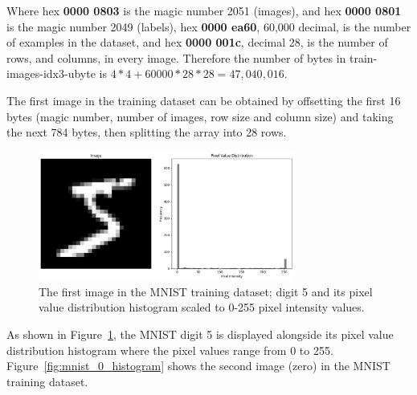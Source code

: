 

Where hex \textbf{0000 0803} is the magic number 2051 (images), and hex \textbf{0000 0801} is the magic number 2049 (labels), hex \textbf{0000 ea60}, 60,000 decimal, is the number of examples in the dataset, and hex \textbf{0000 001c}, decimal 28, is the number of rows, and columns, in every image. Therefore the number of bytes in train-images-idx3-ubyte is $4 * 4 + 60000 * 28 * 28 = 47,040,016$.

The first image in the training dataset can be obtained by offsetting the first 16 bytes (magic number, number of images, row size and column size) and taking the next 784 bytes, then splitting the array into 28 rows.


\begin{figure}[h]
    \centering
    \includegraphics[width=0.75\textwidth]{Figures/Methods/MNIST_5_with_histogram.png}
    \caption{The first image in the MNIST training dataset; digit 5 and its pixel value distribution histogram scaled to 0-255 pixel intensity values.}
    \label{fig:mnist_5_histogram}
\end{figure}
As shown in Figure~\ref{fig:mnist_5_histogram}, the MNIST digit 5 is displayed alongside its pixel value distribution histogram where the pixel values range from 0 to 255. Figure~\ref{fig:mnist_0_histogram} shows the second image (zero) in the MNIST training dataset.

